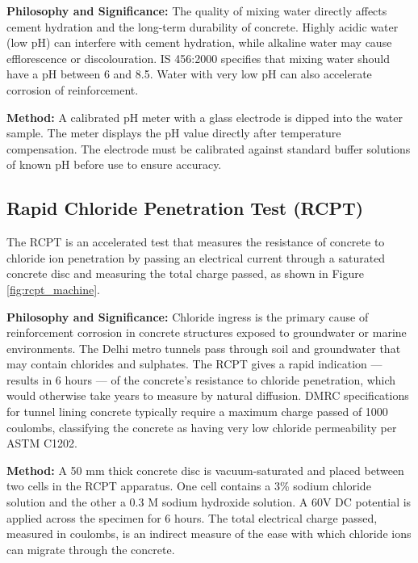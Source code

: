 \par\noindent
\textbf{Philosophy and Significance:} The quality of mixing water directly affects cement hydration and the long-term durability of concrete. Highly acidic water (low pH) can interfere with cement hydration, while alkaline water may cause efflorescence or discolouration. IS 456:2000 specifies that mixing water should have a pH between 6 and 8.5. Water with very low pH can also accelerate corrosion of reinforcement.

\par\noindent
\textbf{Method:} A calibrated pH meter with a glass electrode is dipped into the water sample. The meter displays the pH value directly after temperature compensation. The electrode must be calibrated against standard buffer solutions of known pH before use to ensure accuracy.

\subsection{Rapid Chloride Penetration Test (RCPT)}
\par\noindent
The RCPT is an accelerated test that measures the resistance of concrete to chloride ion penetration by passing an electrical current through a saturated concrete disc and measuring the total charge passed, as shown in Figure \ref{fig:rcpt_machine}.

\par\noindent
\textbf{Philosophy and Significance:} Chloride ingress is the primary cause of reinforcement corrosion in concrete structures exposed to groundwater or marine environments. The Delhi metro tunnels pass through soil and groundwater that may contain chlorides and sulphates. The RCPT gives a rapid indication --- results in 6 hours --- of the concrete's resistance to chloride penetration, which would otherwise take years to measure by natural diffusion. DMRC specifications for tunnel lining concrete typically require a maximum charge passed of 1000 coulombs, classifying the concrete as having very low chloride permeability per ASTM C1202.

\par\noindent
\textbf{Method:} A 50 mm thick concrete disc is vacuum-saturated and placed between two cells in the RCPT apparatus. One cell contains a 3\% sodium chloride solution and the other a 0.3 M sodium hydroxide solution. A 60V DC potential is applied across the specimen for 6 hours. The total electrical charge passed, measured in coulombs, is an indirect measure of the ease with which chloride ions can migrate through the concrete.

